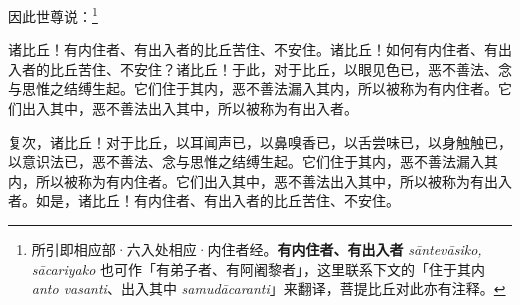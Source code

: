 
因此世尊说：\footnote{所引即相应部·六入处相应·内住者经。\textbf{有内住者、有出入者} \textit{sāntevāsiko, sācariyako} 也可作「有弟子者、有阿阇黎者」，这里联系下文的「住于其内 \textit{anto vasanti}、出入其中 \textit{samudācaranti}」来翻译，菩提比丘对此亦有注释。}


\begin{quoting}诸比丘！有内住者、有出入者的比丘苦住、不安住。诸比丘！如何有内住者、有出入者的比丘苦住、不安住？诸比丘！于此，对于比丘，以眼见色已，恶不善法、念与思惟之结缚生起。它们住于其内，恶不善法漏入其内，所以被称为有内住者。它们出入其中，恶不善法出入其中，所以被称为有出入者。\end{quoting}


\begin{quoting}复次，诸比丘！对于比丘，以耳闻声已，以鼻嗅香已，以舌尝味已，以身触触已，以意识法已，恶不善法、念与思惟之结缚生起。它们住于其内，恶不善法漏入其内，所以被称为有内住者。它们出入其中，恶不善法出入其中，所以被称为有出入者。如是，诸比丘！有内住者、有出入者的比丘苦住、不安住。\end{quoting}


